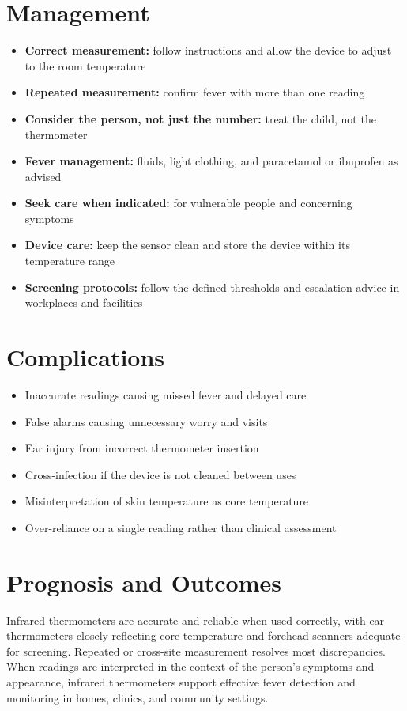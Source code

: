 \section*{Management}
\begin{itemize}
    \item \textbf{Correct measurement:} follow instructions and allow the device to adjust to the room temperature
    \item \textbf{Repeated measurement:} confirm fever with more than one reading
    \item \textbf{Consider the person, not just the number:} treat the child, not the thermometer
    \item \textbf{Fever management:} fluids, light clothing, and paracetamol or ibuprofen as advised
    \item \textbf{Seek care when indicated:} for vulnerable people and concerning symptoms
    \item \textbf{Device care:} keep the sensor clean and store the device within its temperature range
    \item \textbf{Screening protocols:} follow the defined thresholds and escalation advice in workplaces and facilities
\end{itemize}

\section*{Complications}
\begin{itemize}
    \item Inaccurate readings causing missed fever and delayed care
    \item False alarms causing unnecessary worry and visits
    \item Ear injury from incorrect thermometer insertion
    \item Cross-infection if the device is not cleaned between uses
    \item Misinterpretation of skin temperature as core temperature
    \item Over-reliance on a single reading rather than clinical assessment
\end{itemize}

\section*{Prognosis and Outcomes}
Infrared thermometers are accurate and reliable when used correctly, with ear thermometers closely reflecting core temperature and forehead scanners adequate for screening. Repeated or cross-site measurement resolves most discrepancies. When readings are interpreted in the context of the person's symptoms and appearance, infrared thermometers support effective fever detection and monitoring in homes, clinics, and community settings.

